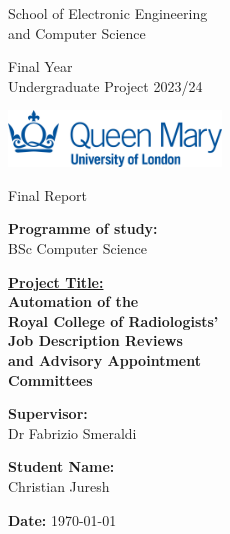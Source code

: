 
\setlength{\columnsep}{1cm}
\setlength{\columnseprule}{1pt}
\begin{titlepage}
\begin{multicols*}{2}

\large
\noindent
School of Electronic Engineering 
\\and Computer Science

\vfill

\noindent
Final Year 
\\Undergraduate Project 2023/24

\vspace{1cm}
\noindent
\includegraphics[width=0.425\textwidth]{images/qmul-logo.jpg}  


\columnbreak

\noindent
Final Report

\vfill

\noindent
\textbf{Programme of study:}
\\BSc Computer Science

\vfill
\noindent
\normalsize
\underline{\textbf{Project Title:}}
\large
\\\textbf{Automation of the \\Royal College of Radiologists' \\Job Description Reviews \\and Advisory Appointment \\Committees}

\large
\vfill
\noindent
\textbf{Supervisor:}
\\Dr Fabrizio Smeraldi

\vfill
\noindent
\textbf{Student Name:}
\\Christian Juresh

\vspace{0pt plus 2fill} 

\noindent
\textbf{Date:} \today

\end{multicols*}
\end{titlepage}
\restoregeometry